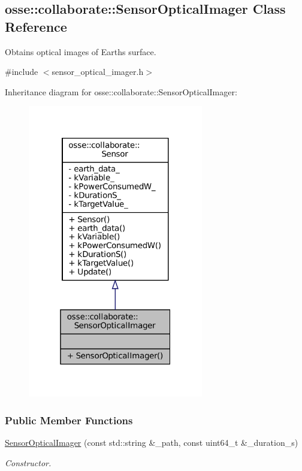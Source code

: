 \hypertarget{classosse_1_1collaborate_1_1_sensor_optical_imager}{}\subsection{osse\+:\+:collaborate\+:\+:Sensor\+Optical\+Imager Class Reference}
\label{classosse_1_1collaborate_1_1_sensor_optical_imager}


Obtains optical images of Earth\textquotesingle{}s surface.  




{\ttfamily \#include $<$sensor\+\_\+optical\+\_\+imager.\+h$>$}



Inheritance diagram for osse\+:\+:collaborate\+:\+:Sensor\+Optical\+Imager\+:
\nopagebreak
\begin{figure}[H]
\begin{center}
\leavevmode
\includegraphics[width=217pt]{classosse_1_1collaborate_1_1_sensor_optical_imager__inherit__graph}
\end{center}
\end{figure}
\subsubsection*{Public Member Functions}
\begin{DoxyCompactItemize}
\item 
\hyperlink{classosse_1_1collaborate_1_1_sensor_optical_imager_adee811f8926a698d9a56815742575259}{Sensor\+Optical\+Imager} (const std\+::string \&\+\_\+path, const uint64\+\_\+t \&\+\_\+duration\+\_\+s)
\begin{DoxyCompactList}\small\item\em Constructor. \end{DoxyCompactList}\end{DoxyCompactItemize}


